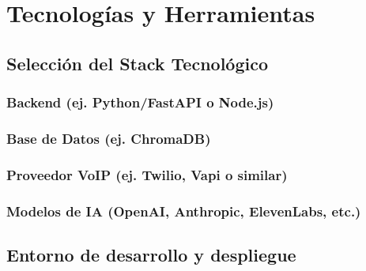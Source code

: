 \chapter{\textbf{Tecnologías y Herramientas}}
\label{ch:Tecnologias}
\thispagestyle{fancy}

\section{Selección del Stack Tecnológico}
\label{sec:stack_tecnologico}

\textoBase

\subsection{Backend (ej. Python/FastAPI o Node.js)}
\label{subsec:backend_stack}

\textoBaseAlt

\subsection{Base de Datos (ej. ChromaDB)}
\label{subsec:base_datos_stack}

\textoBase

\subsection{Proveedor VoIP (ej. Twilio, Vapi o similar)}
\label{subsec:voip_stack}

\textoBaseAlt

\subsection{Modelos de IA (OpenAI, Anthropic, ElevenLabs, etc.)}
\label{subsec:modelos_ia_stack}

\textoBase

\section{Entorno de desarrollo y despliegue}
\label{sec:entorno_desarrollo_despliegue}

\textoBaseAlt

